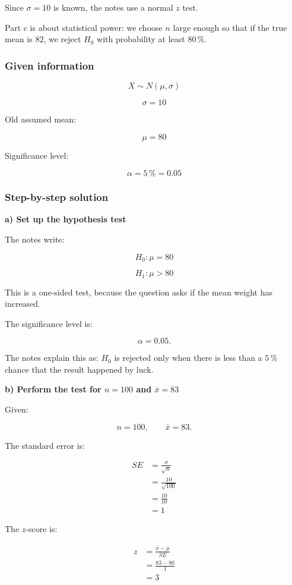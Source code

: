 \documentclass[10pt]{article}
\begin{document}
Since $\sigma=10$ is known, the notes use a normal $z$ test.

Part c is about statistical power:
we choose $n$ large enough so that if the true mean is $82$,
we reject $H_0$ with probability at least $80\,\%$.

\subsubsection*{Given information}
\[
X\sim N(\mu,\sigma)
\]

\[
\sigma=10
\]

Old assumed mean:

\[
\mu=80
\]

Significance level:

\[
\alpha=5\,\%=0.05
\]

\subsubsection*{Step-by-step solution}

\textbf{a) Set up the hypothesis test}

The notes write:

\[
H_0:\mu=80
\]

\[
H_1:\mu>80
\]

This is a one-sided test, because the question asks if the mean
weight has increased.

The significance level is:

\[
\alpha=0.05.
\]

The notes explain this as:
$H_0$ is rejected only when there is less than a $5\,\%$ chance that
the result happened by luck.

\textbf{b) Perform the test for $n=100$ and $\bar{x}=83$}

Given:

\[
n=100,
\qquad
\bar{x}=83.
\]

The standard error is:

\begin{align*}
SE
&=
\frac{\sigma}{\sqrt{n}} \\[2mm]
&=
\frac{10}{\sqrt{100}} \\[2mm]
&=
\frac{10}{10} \\[2mm]
&=1
\end{align*}

The $z$-score is:

\begin{align*}
z
&=
\frac{\bar{x}-\mu}{SE} \\[2mm]
&=
\frac{83-80}{1} \\[2mm]
&=3
\end{align*}
\end{document}
